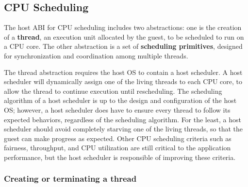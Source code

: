 \subsection{CPU Scheduling}
\label{sec:abi:thread}

The host ABI for CPU scheduling includes two abstractions:
one is the creation of a {\bf thread}, an execution unit allocated by the guest,
to be scheduled to run on a CPU core.
The other abstraction is a set of {\bf scheduling primitives},
designed for synchronization and coordination
among multiple threads.



The thread abstraction requires the host OS to contain a host scheduler.
A host scheduler will dynamically assign one of the living threads to each CPU core, to allow the thread to continue execution until rescheduling.
The scheduling algorithm of a host scheduler is up to
the design and configuration of the host OS;
however, a host scheduler does have to ensure every thread to follow its expected behaviors,
regardless of the scheduling algorithm.
For the least, a host scheduler should avoid completely starving one of the living threads,
so that the guest can make progress as expected.
Other CPU scheduling criteria such as fairness, throughput, and CPU utilization
are still critical to the application performance, but the host scheduler is responsible of improving these criteria.






\subsubsection*{Creating or terminating a thread}





